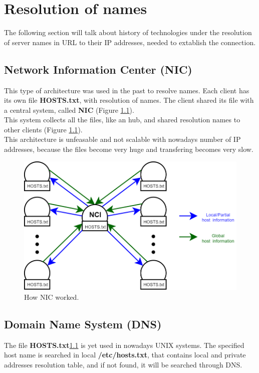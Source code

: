 \chapter{Resolution of names}
The following section will talk about history of technologies under the resolution of server names in URL to their IP addresses, needed to extablish the connection.

\section{Network Information Center (NIC)}\label{NIC_section}
This type of architecture was used in the past to resolve names. Each client has its own file \textbf{HOSTS.txt}, with resolution of names. The client shared its file with a central system, called \textbf{NIC} (Figure \ref{NIC}).\\
This system collects all the files, like an hub, and shared resolution names to other clients (Figure \ref{NIC}).\\
This architecture is unfeasable and not scalable with nowadays number of IP addresses, because the files become very huge and transfering becomes very slow.\\
\begin{figure}[h]
\centering
\includegraphics[scale=0.55]{Images/Resolution/NIC}
\caption{\footnotesize{How NIC worked.}}\label{NIC}
\end{figure}


\section{Domain Name System (DNS)}\label{DNS_system}
The file \textbf{HOSTS.txt}\ref{NIC_section} is yet used in nowadays UNIX systems. The specified host name is searched in local \textbf{/etc/hosts.txt}, that contains local and private addresses resolution table, and if not found, it will be searched through DNS\cite{RFC1034}.

